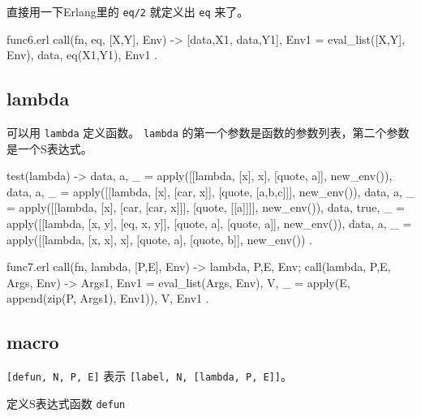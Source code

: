 \documentclass[preview,multi,crop=false,border=1in,class=memoir]{standalone}
\begin{document}
\begin{preview-page}
直接用一下Erlang里的 \verb|eq/2| 就定义出 \verb|eq| 来了。

\begin{SourceCode}[50][53]{func6.erl}
call({fn, eq}, [X,Y], Env) ->
    {[{data,X1}, {data,Y1}], Env1} =
        eval_list([X,Y], Env),
    {{data, eq(X1,Y1)}, Env1}
.
\end{SourceCode}

\subsection{lambda}

可以用 \verb|lambda| 定义函数。 \verb|lambda| 的第一个参数是函数的参数列表，第二个参数是一个S表达式。

\begin{SourceCode}
test(lambda) ->
    {{data, a}, _} =
        apply([[lambda, [x], x],
               [quote, a]], new_env()),
    {{data, a}, _} =
        apply([[lambda, [x], [car, x]],
               [quote, [a,b,c]]], new_env()),
    {{data, a}, _} =
        apply([[lambda, [x], [car, [car, x]]],
               [quote, [[a]]]], new_env()),
    {{data, true}, _} =
        apply([[lambda, [x, y], [eq, x, y]],
               [quote, a],
               [quote, a]], new_env()),
    {{data, a}, _} =
        apply([[lambda, [x, x], x],
               [quote, a],
               [quote, b]], new_env())
.
\end{SourceCode}


\begin{SourceCode}[54][59]{func7.erl}
call({fn, lambda}, [P,E], Env) ->
    {{lambda, {P,E}}, Env};
call({lambda, {P,E}}, Args, Env) ->
    {Args1, Env1} = eval_list(Args, Env),
    {V, _} = apply(E, append(zip(P, Args1), Env1)),
    {V, Env1}
.
\end{SourceCode}


\subsection{macro}

\begin{Exercise}[title={defun},difficulty=1]
\verb|[defun, N, P, E]| 表示 \verb|[label, N, [lambda, P, E]]|\cite{Graham:2001:roots}。

定义S表达式函数 \verb|defun|


\end{Exercise}
\end{preview-page}
\end{document}
